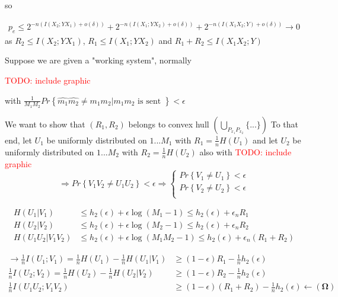 \documentclass[twoside]{article}
\theoremstyle{definition} %
\newcommand{\todo}[1]{\textcolor{red}{TODO: #1}}
\renewcommand{\Pr}[1]{Pr\left\{#1\right\}}
\begin{document}
so

\begin{align*}
  p_e \leq 2^{-n(I(X_2;YX_1) + o(\delta))} + 2^{-n(I(X_1;YX_2) + o(\delta))} + 2^{-n(I(X_1X_2;Y) + o(\delta))} \to 0
\end{align*}
as $R_2\leq I(X_2;YX_1)$, $R_1\leq I(X_1;YX_2)$ and $R_1 + R_2\leq I(X_1X_2;Y)$
























Suppose we are given a "working system", normally

\todo{include graphic}

with $\frac{1}{M_1 M_2} \Pr{\hat{m_1}\hat{m_2} \neq m_1 m_2 | m_1 m_2 \text{ is sent }} < \epsilon$

We want to show that $(R_1, R_2)$ belongs to convex hull $(\bigcup_{P_{x_1} P_{x_2}} \{...\})$
To that end, let $U_1$ be uniformly distributed on ${1 ... M_1}$ with $R_1 = \frac{1}{n} H(U_1)$ and let $U_2$ be uniformly distributed on ${1 ... M_2}$ with $R_2 = \frac{1}{n} H(U_2)$
also with \todo{include graphic}
\[
  \Rightarrow \Pr{V_1 V_2 \neq U_1 U_2} < \epsilon \Rightarrow
  \left\{
  \begin{array}{c}
    \Pr{V_1 \neq U_1} < \epsilon \\
    \Pr{V_2 \neq U_2} < \epsilon \\
  \end{array}
  \right.
\]


\begin{align*}
  H(U_1 | V_1) &\leq h_2(\epsilon) + \epsilon \log(M_1 - 1) \leq h_2(\epsilon) + \epsilon_n R_1 \\
  H(U_2 | V_2) &\leq h_2(\epsilon) + \epsilon \log(M_2 - 1) \leq h_2(\epsilon) + \epsilon_n R_2 \\
  H(U_1 U_2 | V_1 V_2) &\leq h_2(\epsilon) + \epsilon \log(M_1 M_2 - 1) \leq h_2(\epsilon) + \epsilon_n (R_1 + R_2)
\end{align*}

\begin{align*}
  \rightarrow \frac{1}{n} I(U_1; V_1) = \frac{1}{n} H(U_1) - \frac{1}{n} H(U_1 | V_1) &\geq (1 - \epsilon) R_1 - \frac{1}{n} h_2(\epsilon)\\
  \frac{1}{n} I(U_2; V_2) = \frac{1}{n} H(U_2) - \frac{1}{n} H(U_2 | V_2) &\geq (1 - \epsilon) R_2 - \frac{1}{n} h_2(\epsilon) \\
  \frac{1}{n} I(U_1 U_2; V_1 V_2) &\geq (1 - \epsilon) (R_1 + R_2) - \frac{1}{n} h_2(\epsilon) \leftarrow \mathbf{(\Omega)}
\end{align*}
\end{document}
